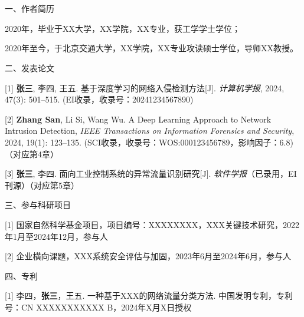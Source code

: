 \chapter{\authorresumetitle}\backmatterformat\setlength{\parindent}{0pt}

一、作者简历

2020年，毕业于XX大学，XX学院，XX专业，获工学学士学位；

2020年至今，于北京交通大学，XX学院，XX专业攻读硕士学位，导师XX教授。

\vspace{4ex}
二、发表论文



[1] \textbf{张三}, 李四, 王五. 基于深度学习的网络入侵检测方法[J]. \emph{计算机学报}, 2024, 47(3): 501--515. (EI收录，收录号：20241234567890)%

[2] \textbf{Zhang San}, Li Si, Wang Wu. A Deep Learning Approach to Network Intrusion Detection, \emph{IEEE Transactions on Information Forensics and Security}, 2024, 19(1): 123--135. (SCI收录，收录号：WOS:000123456789，影响因子：6.8)（对应第4章）

[3] \textbf{张三}, 李四. 面向工业控制系统的异常流量识别研究[J]. \emph{软件学报}（已录用，EI刊源）（对应第5章）

\vspace{4ex}
三、参与科研项目

[1] 国家自然科学基金项目，项目编号：XXXXXXXX，XXX关键技术研究，2022年1月至2024年12月，参与人

[2] 企业横向课题，XXX系统安全评估与加固，2023年6月至2024年6月，参与人

\vspace{4ex}
四、专利

[1] 李四，\textbf{张三}，王五. 一种基于XXX的网络流量分类方法. 中国发明专利，专利号：CN XXXXXXXXXXX B，2024年X月X日授权

